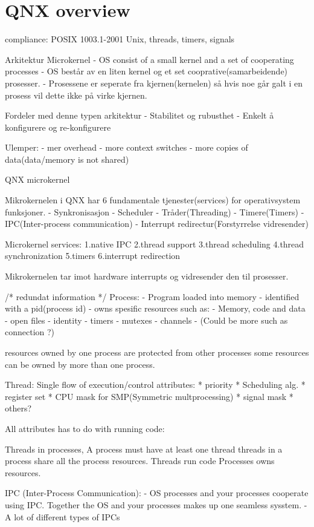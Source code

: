 \chapter{QNX overview}

compliance: POSIX 1003.1-2001
Unix, threads, timers, signals

Arkitektur
Microkernel
- OS consist of a small kernel and a set of cooperating processes
- OS består av en liten kernel og et set cooprative(samarbeidende) prosesser.
- Prosessene er seperate fra kjernen(kernelen) så hvis noe går galt i en prosess vil dette ikke på virke kjernen.

Fordeler med denne typen arkitektur
- Stabilitet og rubusthet
- Enkelt å konfigurere og re-konfigurere

Ulemper:
- mer overhead
    - more context switches
    - more copies of data(data/memory is not shared)
    
QNX microkernel

Mikrokernelen i QNX har 6 fundamentale tjenester(services) for operativsystem funksjoner.
- Synkronisasjon
- Scheduler
- Tråder(Threading)
- Timere(Timers)
- IPC(Inter-process communication)
- Interrupt redirectur(Forstyrrelse vidresender)

Microkernel services:
1.native IPC
2.thread support
3.thread scheduling
4.thread synchronization
5.timers
6.interrupt redirection

Mikrokernelen tar imot hardware interrupts og vidresender den til prosesser.

/* redundat information */
Process:
- Program loaded into memory
- identified with a pid(process id)
- owns spesific resources such as:
    - Memory, code and data
    - open files
    - identity
    - timers
    - mutexes
    - channels
    - (Could be more such as connection ?)

resources owned by one process are protected from other processes
some resources can be owned by more than one process.

Thread:
Single flow of execution/control
attributes:
* priority
* Scheduling alg.
* register set
* CPU mask for SMP(Symmetric multprocessing)
* signal mask
* others?

All attributes has to do with running code:

Threads in processes, 
A process must have at least one thread
threads in a process share all the process resources.
Threads run code
Processes owns resources.

IPC (Inter-Process Communication):
- OS processes and your processes cooperate using IPC. Together the OS and your processes makes up one seamless sysstem.
- A lot of different types of IPCs

